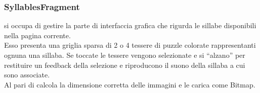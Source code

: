 \subsubsection{SyllablesFragment}
\label{sec:syllables_fragment}

 si occupa di gestire la parte di interfaccia grafica che rigurda le sillabe disponibili nella pagina corrente.\\
Esso presenta una griglia sparsa di 2 o 4 tessere di puzzle colorate rappresentanti ognuna una sillaba. Se toccate le tessere vengono selezionate e si ``alzano'' per restituire un feedback della selezione e riproducono il suono della sillaba a cui sono associate.\\
Al pari di  calcola la dimensione corretta delle immagini e le carica come Bitmap.
